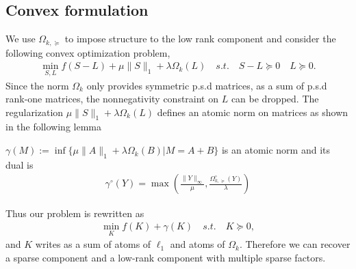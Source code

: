 \subsection{Convex formulation}

We use $\Omega_{k,\succeq}$ to impose structure to the low rank component and consider the following convex optimization problem,
\begin{align}
\label{opt}
\min_{S,L} f(S-L)+\mu\|S\|_{1}+\lambda\Omega_k(L) \quad s.t. \quad S-L \succeq 0 \quad L \succeq 0.
\end{align}
Since the norm $\Omega_k$ only provides symmetric p.s.d matrices, as a sum of p.s.d rank-one matrices, the nonnegativity constraint on $L$ can be dropped. The regularization $\mu\|S\|_{1}+\lambda\Omega_k(L)$ defines an atomic norm on matrices as shown in the following lemma
\begin{lemm} $\gamma(M):=\inf\{\mu\|A\|_{1}+\lambda\Omega_k(B)|M=A+B\}$ is an atomic norm and its dual is 
\begin{align*}
\gamma^{\circ}(Y)=\max\left(\frac{\|Y\|_{\infty}}{\mu},\frac{\Omega_{k,\succeq}^{\circ}(Y)}{\lambda}\right)
\end{align*}
\end{lemm}
Thus our problem is rewritten as
\begin{align}
\label{opt_at}
\min_{K} f(K)+ \gamma(K) \quad s.t. \quad K \succeq 0,
\end{align}
and $K$ writes as a sum of atoms of $\ell_1$ and atoms of $\Omega_k$. Therefore we can recover a sparse component and a low-rank component with multiple sparse factors.\\

